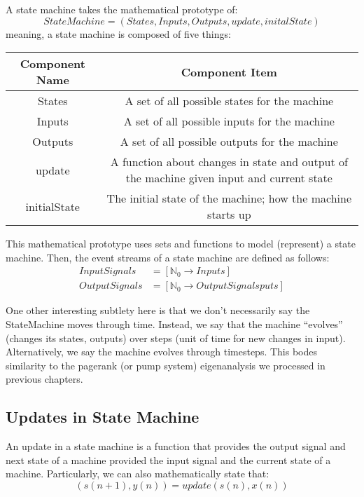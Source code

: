 A state machine takes the mathematical prototype of:
\[
    StateMachine = (States, Inputs, Outputs, update, initalState)
\]
meaning, a state machine is composed of five things:
\begin{center}
    \begin{tabular}{c||c}
        Component Name & Component Item \\
        \hline
        States & A set of all possible states for the machine \\
        Inputs & A set of all possible inputs for the machine \\
        Outputs & A set of all possible outputs for the machine \\
        update & A function about changes in state and output of the machine given input and current state \\
        initialState & The initial state of the machine; how the machine starts up
    \end{tabular}
\end{center}

This mathematical prototype uses sets and functions to model (represent) a state machine.
Then, the event streams of a state machine are defined as follows:
\begin{align*}
    InputSignals &= [\mathbb{N}_0 \rightarrow Inputs] \\
    OutputSignals &= [\mathbb{N}_0 \rightarrow OutputSignalsputs]
\end{align*}

One other interesting subtlety here is that we don't necessarily say the StateMachine moves through time. Instead, we say that the machine ``evolves'' (changes its states, outputs) over steps (unit of time for new changes in input).
Alternatively, we say the machine evolves through timesteps. This bodes similarity to the pagerank (or pump system) eigenanalysis we processed in previous chapters.

\subsection{Updates in State Machine}
An update in a state machine is a function that provides the output signal and next state of a machine provided the input signal and the current state of a machine.
Particularly, we can also mathematically state that:
\[
   ( s(n+1), y(n)) = update(s(n), x(n))
\]

